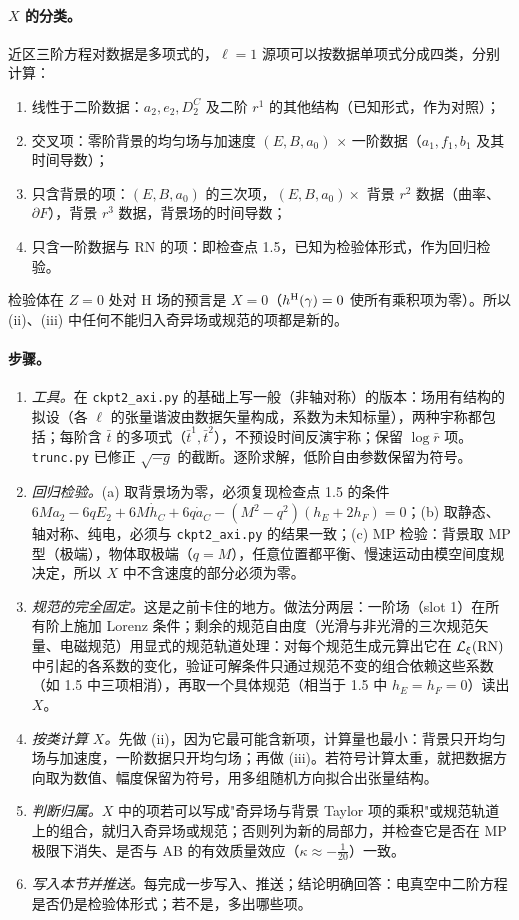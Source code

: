 \documentclass[11pt,a4paper]{ctexart}
\numberwithin{equation}{section}
\begin{document}
\paragraph{$X$ 的分类。}近区三阶方程对数据是多项式的，$\ell=1$ 源项可以按数据单项式分成四类，分别计算：
\begin{enumerate}
\item[(i)] 线性于二阶数据：$a_2,e_2,D^C_2$ 及二阶 $r^1$ 的其他结构（已知形式，作为对照）；
\item[(ii)] 交叉项：零阶背景的均匀场与加速度 $(E,B,a_0)$ $\times$ 一阶数据（$a_1,f_1,b_1$ 及其时间导数）；
\item[(iii)] 只含背景的项：$(E,B,a_0)$ 的三次项，$(E,B,a_0)\times$ 背景 $r^2$ 数据（曲率、$\partial F$），背景 $r^3$ 数据，背景场的时间导数；
\item[(iv)] 只含一阶数据与 RN 的项：即检查点 1.5，已知为检验体形式，作为回归检验。
\end{enumerate}
检验体在 $Z=0$ 处对 H 场的预言是 $X=0$（$h^{\rm H}(\gamma)=0$ 使所有乘积项为零）。所以 (ii)、(iii) 中任何不能归入奇异场或规范的项都是新的。

\paragraph{步骤。}
\begin{enumerate}
\item \emph{工具。}在 \texttt{ckpt2\_axi.py} 的基础上写一般（非轴对称）的版本：场用有结构的拟设（各 $\ell$ 的张量谐波由数据矢量构成，系数为未知标量），两种宇称都包括；每阶含 $\bar t$ 的多项式（$\bar t^1,\bar t^2$），不预设时间反演宇称；保留 $\log\bar r$ 项。\texttt{trunc.py} 已修正 $\sqrt{-g}$ 的截断。逐阶求解，低阶自由参数保留为符号。
\item \emph{回归检验。}(a) 取背景场为零，必须复现检查点 1.5 的条件 $6Ma_2-6qE_2+6M\dot h_C+6q\dot a_C-(M^2-q^2)(h_E+2h_F)=0$；(b) 取静态、轴对称、纯电，必须与 \texttt{ckpt2\_axi.py} 的结果一致；(c) MP 检验：背景取 MP 型（极端），物体取极端（$q=M$），任意位置都平衡、慢速运动由模空间度规决定，所以 $X$ 中不含速度的部分必须为零。
\item \emph{规范的完全固定。}这是之前卡住的地方。做法分两层：一阶场（slot 1）在所有阶上施加 Lorenz 条件；剩余的规范自由度（光滑与非光滑的三次规范矢量、电磁规范）用显式的规范轨道处理：对每个规范生成元算出它在 $\mathcal L_\xi({\rm RN})$ 中引起的各系数的变化，验证可解条件只通过规范不变的组合依赖这些系数（如 1.5 中三项相消），再取一个具体规范（相当于 1.5 中 $h_E=h_F=0$）读出 $X$。
\item \emph{按类计算 $X$。}先做 (ii)，因为它最可能含新项，计算量也最小：背景只开均匀场与加速度，一阶数据只开均匀场；再做 (iii)。若符号计算太重，就把数据方向取为数值、幅度保留为符号，用多组随机方向拟合出张量结构。
\item \emph{判断归属。}$X$ 中的项若可以写成"奇异场与背景 Taylor 项的乘积"或规范轨道上的组合，就归入奇异场或规范；否则列为新的局部力，并检查它是否在 MP 极限下消失、是否与 AB 的有效质量效应（$\kappa\approx-\tfrac1{20}$）一致。
\item \emph{写入本节并推送。}每完成一步写入、推送；结论明确回答：电真空中二阶方程是否仍是检验体形式；若不是，多出哪些项。
\end{enumerate}
\end{document}
